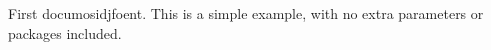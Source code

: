 \documentclass{article}
\begin{document}
First documosidjfoent. This is a simple example, with no
extra parameters or packages included.
\end{document}
